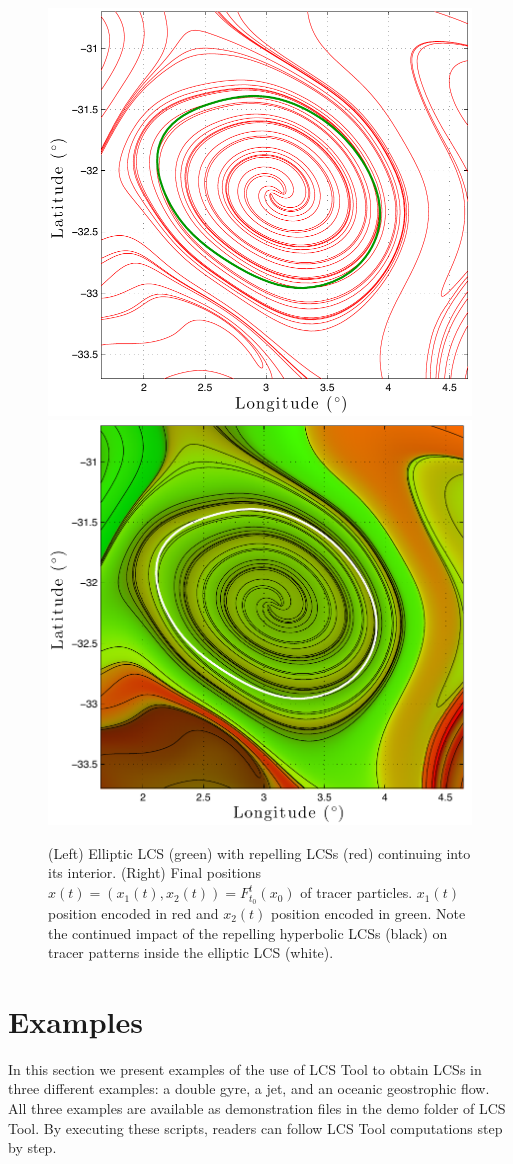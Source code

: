\documentclass{elsarticle}
\begin{document}
\begin{figure}[hbt]
\centering
\includegraphics[width=.49\textwidth]{graphics/ocean_dataset/LCS_fwd_coherent_eddy}
\includegraphics[width=.49\textwidth]{graphics/ocean_dataset/LCS_fwd_colortracer}
\caption{(Left) Elliptic LCS (green) with repelling LCSs (red) continuing into its interior. (Right) Final positions $x(t) = (x_1(t),x_2(t)) = F_{t_0}^t(x_0)$ of tracer particles. $x_1(t)$ position encoded in red and $x_2(t)$ position encoded in green. Note the continued impact of the repelling hyperbolic LCSs (black) on tracer patterns inside the elliptic LCS (white).}
\label{f:ocean_dataset_colortracer}
\end{figure}


\section{Examples}

In this section we present examples of the use of LCS Tool to obtain LCSs in three different examples: a double gyre, a jet, and an oceanic geostrophic flow. All three examples are available as demonstration files in the demo folder of LCS Tool. By executing these scripts, readers can follow LCS Tool computations step by step.
\end{document}
